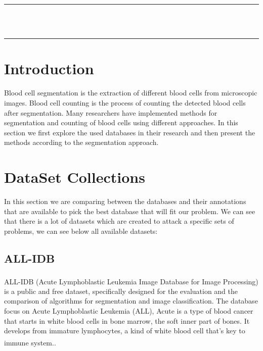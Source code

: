 \thispagestyle{empty}
\vspace*{\fill}
\begin{center}
    {\color{Black} \rule{\linewidth}{1.2mm} }\\
\vspace{0.25in}
 {\centering{}}
\vspace{0.35in}\\
    {\color{Black} \rule{\linewidth}{1.2mm} }
\end{center}
\vspace*{\fill}
\setcounter{section}{0}

\newpage

\section{Introduction}
\vspace{0.2in}
\hspace{\parindent}
Blood cell segmentation is the extraction of different blood cells from microscopic images. Blood cell counting is the process of counting the detected blood cells after segmentation. Many researchers have implemented methods for segmentation and counting of blood cells using different approaches. In this section we first explore the used databases in their research and then present the methods according to the segmentation approach.

\section{DataSet Collections}
In this section we are comparing between the databases and their annotations that are available to pick the best database that will fit our problem. We can see that there is a lot of datasets which are created to attack a specific sets of problems, we can see below all available datasets:

\subsection{ALL-IDB}
\hspace{\parindent}
ALL-IDB (Acute Lymphoblastic Leukemia Image Database for Image Processing) \textsuperscript{\cite{labati2011all}} is a public and free dataset, specifically designed for the evaluation and the comparison of algorithms for segmentation and image classification. The database focus on Acute Lymphoblastic Leukemia (ALL), Acute is a type of blood cancer that starts in white blood cells in bone marrow, the soft inner part of bones. It develops from immature lymphocytes, a kind of white blood cell that’s key to immune system.\textsuperscript{\cite{Annie_Stuart_What_2022_webmd}}.\

